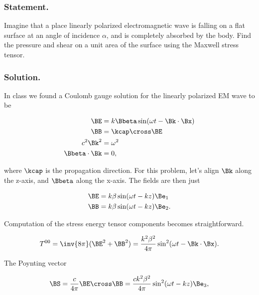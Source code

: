 \subsubsection{Statement.}

Imagine that a place linearly polarized electromagnetic wave is falling on a flat surface at an angle of incidence $\alpha$, and is completely absorbed by the body.  Find the pressure and shear on a unit area of the surface using the Maxwell stress tensor.

\subsubsection{Solution.}

In class we found a Coulomb gauge solution for the linearly polarized EM wave to be

\begin{align}\label{eqn:relativisticElectrodynamicsPS6P1:400}
\BE &= k \Bbeta \sin( \omega t - \Bk \cdot \Bx ) \\
\BB &= \kcap \cross \BE \\
c^2 \Bk^2 &= \omega^2 \\
\Bbeta \cdot \Bk &= 0,
\end{align}

where $\kcap$ is the propagation direction.  For this problem, let's align $\Bk$ along the z-axis, and $\Bbeta$ along the x-axis.  The fields are then just

\begin{align}\label{eqn:relativisticElectrodynamicsPS6P1:420}
\BE &= k \beta \sin( \omega t - k z ) \Be_1 \\
\BB &= k \beta \sin( \omega t - k z ) \Be_2.
\end{align}

Computation of the stress energy tensor components becomes straightforward.

\begin{equation}\label{eqn:relativisticElectrodynamicsPS6P1:440}
T^{0 0} = \inv{8 \pi} (\BE^2 + \BB^2) = \frac{k^2 \beta^2}{4 \pi} \sin^2(\omega t - \Bk \cdot \Bx).
\end{equation}

The Poynting vector

\begin{equation}\label{eqn:relativisticElectrodynamicsPS6P1:460}
\BS = \frac{c}{4 \pi} \BE \cross \BB = \frac{c k^2 \beta^2}{4 \pi} \sin^2(\omega t - k z) \Be_3,
\end{equation}

